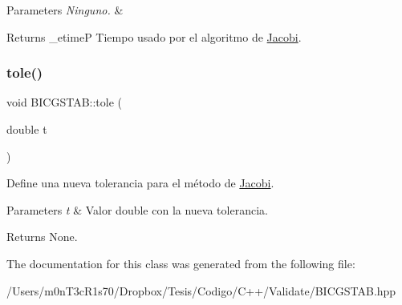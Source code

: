 \begin{DoxyParams}{Parameters}
{\em Ninguno.} & \\
\hline
\end{DoxyParams}
\begin{DoxyReturn}{Returns}
\+\_\+etimeP Tiempo usado por el algoritmo de \hyperlink{class_jacobi}{Jacobi}. 
\end{DoxyReturn}
\hypertarget{class_b_i_c_g_s_t_a_b_ab0a72020c9ea0f2fecf806e973c1b41e}{}\label{class_b_i_c_g_s_t_a_b_ab0a72020c9ea0f2fecf806e973c1b41e} 
\subsubsection{\texorpdfstring{tole()}{tole()}}
{\footnotesize\ttfamily void B\+I\+C\+G\+S\+T\+A\+B\+::tole (\begin{DoxyParamCaption}\item[{double}]{t }\end{DoxyParamCaption})\hspace{0.3cm}{\ttfamily [inline]}}



Define una nueva tolerancia para el método de \hyperlink{class_jacobi}{Jacobi}. 


\begin{DoxyParams}{Parameters}
{\em t} & Valor double con la nueva tolerancia. \\
\hline
\end{DoxyParams}
\begin{DoxyReturn}{Returns}
None. 
\end{DoxyReturn}


The documentation for this class was generated from the following file\+:\begin{DoxyCompactItemize}
\item 
/\+Users/m0n\+T3c\+R1s70/\+Dropbox/\+Tesis/\+Codigo/\+C++/\+Validate/B\+I\+C\+G\+S\+T\+A\+B.\+hpp\end{DoxyCompactItemize}
